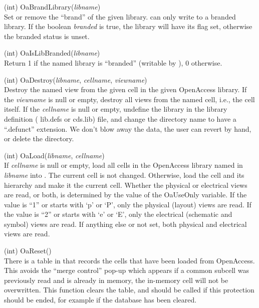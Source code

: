\begin{description}
\item{(int) \vt OaBrandLibrary({\it libname\/})}\\
Set or remove the {\Xic} ``brand'' of the given library.  {\Xic} can
only write to a branded library.  If the boolean {\it branded} is
true, the library will have its flag set, otherwise the branded status
is unset.

\item{(int) \vt OaIsLibBranded({\it libname\/})}\\
Return 1 if the named library is ``branded'' (writable by {\Xic}), 0
otherwise.

\item{(int) \vt OaDestroy({\it libname\/}, {\it cellname\/},
  {\it viewname\/})}\\
Destroy the named view from the given cell in the given OpenAccess
library.  If the {\it viewname} is null or empty, destroy all views
from the named cell, i.e., the cell itself.  If the {\it cellname} is
null or empty, undefine the library in the library definition ({\vt
lib.defs} or {\vt cds.lib}) file, and change the directory name to
have a ``{\vt .defunct}'' extension.  We don't blow away the data, the
user can revert by hand, or delete the directory.

\item{(int) \vt OaLoad({\it libname\/}, {\it cellname\/})}\\
If {\it cellname} is null or empty, load all cells in the OpenAccess
library named in {\it libname} into {\Xic}.  The current cell is not
changed.  Otherwise, load the cell and its hierarchy and make it the
current cell.  Whether the physical or electrical views are read, or
both, is determined by the value of the {\et OaUseOnly} variable.  If
the value is ``1'' or starts with `p' or `P', only the physical
(layout) views are read.  If the value is ``2'' or starts with `e' or
`E', only the electrical (schematic and symbol) views are read.  If
anything else or not set, both physical and electrical views are read.

\item{(int) \vt OaReset()}\\
There is a table in {\Xic} that records the cells that have been
loaded from OpenAccess.  This avoids the ``merge control'' pop-up
which appears if a common subcell was previously read and is already
in memory, the in-memory cell will not be overwritten.  This function
clears the table, and should be called if this protection should be
ended, for example if the {\Xic} database has been cleared.


\end{description}

